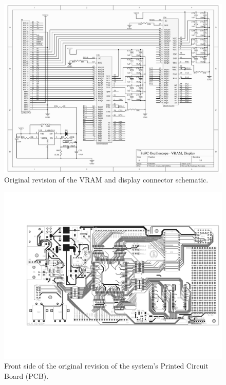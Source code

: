 \documentclass[titlepage]{scrartcl}
\begin{document}
\begin{appendices}
	\begin{figure}[h!]
	\vspace{-2cm}
	\centerline{\includegraphics[width=26cm, angle=90, origin=c]{img/vram_disp_old.pdf}}
                	\caption{Original revision of the VRAM and display connector schematic.}
               	\label{fig:orig_schem_5}
	\end{figure}

	\begin{figure}[h!]
	\vspace{-2cm}
	\centerline{\includegraphics[width=28cm, angle=90, origin=c]{img/pcb_old.pdf}}
		\vspace{-2cm}
                	\caption{Front side of the original revision of the system's Printed Circuit Board (PCB).}
               	\label{fig:orig_pcb_1}
	\end{figure}
	

\end{appendices}
\end{document}
